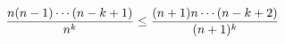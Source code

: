 \documentclass[preview]{standalone}
\begin{document}
\begin{align*}
\special{dvisvgm:raw <g id='unique000'>}\dfrac{n(n-1)\cdots(n-k+1)}{n^k}\le\dfrac{(n+1)n\cdots(n-k+2)}{(n+1)^k}\special{dvisvgm:raw </g>}
\end{align*}
\end{document}

